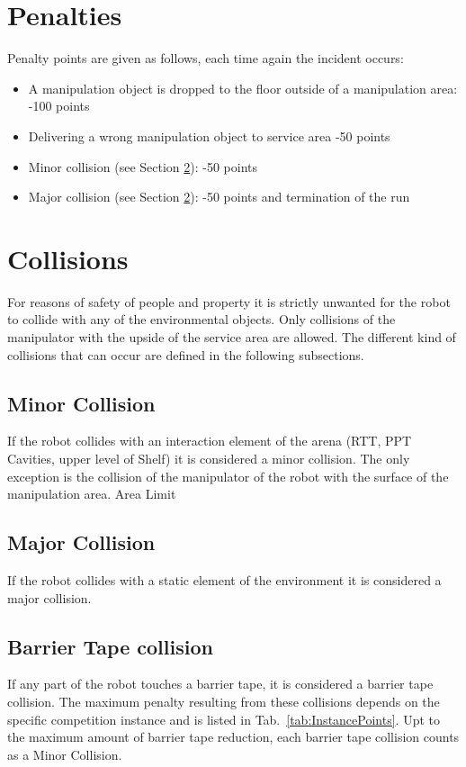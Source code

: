 \section{Penalties}
\label{sec:penalties}
Penalty points are given as follows, each time again the incident occurs:

\begin{itemize}
	\item A manipulation object is dropped to the floor outside of a manipulation area: \hfill -100 points
	\item Delivering a wrong manipulation object to service area \hfill -50 points
	\item Minor collision (see Section \ref{sec:Collisions}): \hfill -50 points
	\item Major collision (see Section \ref{sec:Collisions}): \hfill -50 points and termination of the run
\end{itemize}

\section{Collisions}\label{sec:Collisions}


For reasons of safety of people and property it is strictly unwanted for the robot to collide with any of the environmental objects. Only collisions of the manipulator with the upside of the service area are allowed. The different kind of collisions that can occur are defined in the following subsections.

\subsection{Minor Collision}
If the robot collides with an interaction element of the arena (RTT, PPT Cavities, upper level of Shelf) it is considered a minor collision. The only exception is the collision of the manipulator of the robot with the surface of the manipulation area. Area Limit

\subsection{Major Collision}
If the robot collides with a static element of the environment it is considered a major collision.

\subsection{Barrier Tape collision}
If any part of the robot touches a barrier tape, it is considered a barrier tape collision. The maximum penalty resulting from these collisions depends on the specific competition instance and is listed in Tab.~\ref{tab:InstancePoints}. Upt to the maximum amount of barrier tape reduction, each barrier tape collision counts as a Minor Collision.

